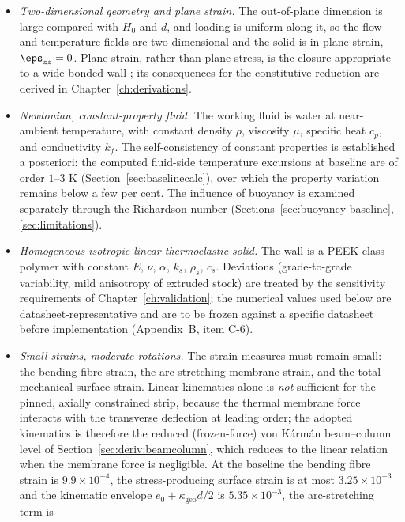 \begin{itemize}\itemsep2pt
\item[\textbf{A1}] \emph{Two-dimensional geometry and plane strain.} The out-of-plane dimension is
large compared with $H_0$ and $d$, and loading is uniform along it, so the flow and temperature
fields are two-dimensional and the solid is in plane strain, $\eps_{zz}=0$. Plane strain, rather
than plane stress, is the closure appropriate to a wide bonded wall
\cite{boley1960theory,timoshenko1970elasticity}; its consequences for the constitutive reduction
are derived in Chapter~\ref{ch:derivations}.
\item[\textbf{A2}] \emph{Newtonian, constant-property fluid.} The working fluid is water at near-ambient
temperature, with constant density $\rho$, viscosity $\mu$, specific heat $c_p$, and conductivity
$k_f$. The self-consistency of constant properties is established a posteriori: the computed
fluid-side temperature excursions at baseline are of order $1$--$3$ K
(Section~\ref{sec:baselinecalc}), over which the property variation remains below a few per cent.
The influence of buoyancy is examined separately through the Richardson number
(Sections~\ref{sec:buoyancy-baseline}, \ref{sec:limitations}).
\item[\textbf{A3}] \emph{Homogeneous isotropic linear thermoelastic solid.} The wall is a PEEK-class
polymer with constant $E$, $\nu$, $\alpha$, $k_s$, $\rho_s$, $c_s$. Deviations (grade-to-grade
variability, mild anisotropy of extruded stock) are treated by the sensitivity requirements of
Chapter~\ref{ch:validation}; the numerical values used below are datasheet-representative and are
to be frozen against a specific datasheet before implementation (Appendix~B, item C-6).
\item[\textbf{A4}] \emph{Small strains, moderate rotations.} The strain measures must remain small:
the bending fibre strain, the arc-stretching membrane strain, and the total mechanical surface
strain. Linear kinematics alone is \emph{not} sufficient for the pinned, axially constrained strip,
because the thermal membrane force interacts with the transverse deflection at leading order; the
adopted kinematics is therefore the reduced (frozen-force) von K\'arm\'an beam--column level of
Section~\ref{sec:deriv:beamcolumn}, which reduces to the linear relation when the membrane force
is negligible. At the baseline the bending fibre strain is $9.9\times10^{-4}$, the stress-producing
surface strain is at most $3.25\times10^{-3}$ and the kinematic envelope $e_0+\kappa_{\mathrm{geo}}
d/2$ is $5.35\times10^{-3}$, the arc-stretching term is

\end{itemize}
